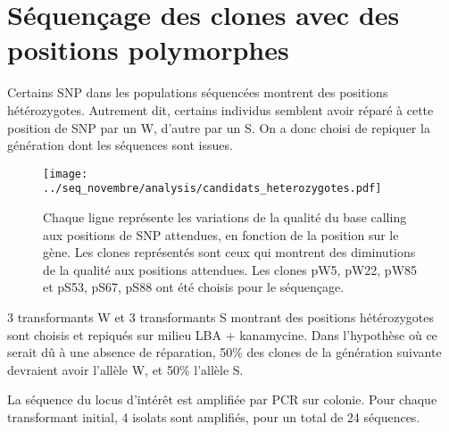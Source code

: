 \documentclass[a4paper, justified]{tufte-handout}
\begin{document}
\section{Séquençage des clones avec des positions polymorphes}
\label{sec:orgheadline7}
Certains SNP dans les populations séquencées montrent des positions
hétérozygotes. Autrement dit, certains individus semblent avoir réparé à cette
position de SNP par un W, d'autre par un S. On a donc choisi de repiquer la
génération dont les séquences sont issues. 

\begin{figure}
  \texttt{[image: ../seq\_novembre/analysis/candidats\_heterozygotes.pdf]}
  \caption{Chaque ligne représente les variations de la qualité du base calling
    aux positions de SNP attendues, en fonction de la position sur le gène. Les
    clones représentés sont ceux qui montrent des diminutions de la qualité aux
    positions attendues. Les clones pW5, pW22, pW85 et pS53, pS67, pS88 ont été
    choisis pour le séquençage.}
\end{figure}

3 transformants W et 3 transformants S montrant des positions hétérozygotes sont
choisis et repiqués sur milieu LBA + kanamycine. Dans l'hypothèse où ce serait
dû à une absence de réparation, 50\% des clones de la génération suivante
devraient avoir l'allèle W, et 50\% l'allèle S.

La séquence du locus d'intérêt est amplifiée par PCR sur colonie. Pour chaque
transformant initial, 4 isolats sont amplifiés, pour un total de 24 séquences.  
\end{document}
